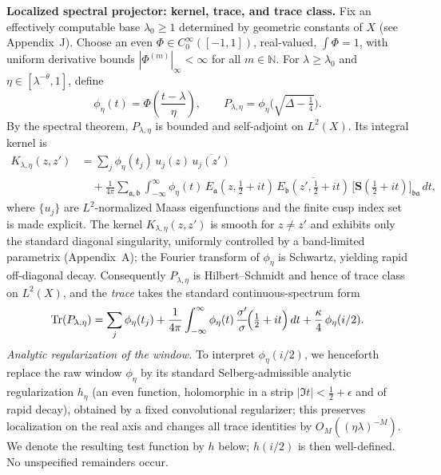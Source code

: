 \medskip
\noindent\textbf{Localized spectral projector: kernel, trace, and trace class.}
Fix an effectively computable base $\lambda_0\ge1$ determined by geometric constants of $X$ (see Appendix~J). Choose an even $\Phi\in C_0^\infty([-1,1])$, real-valued, $\int\Phi=1$, with uniform derivative bounds $|\Phi^{(m)}|_\infty<\infty$ for all $m\in\mathbb{N}$. For $\lambda\ge\lambda_0$ and $\eta\in[\lambda^{-\theta},1]$, define
\[
\phi_\eta(t)=\Phi\!\left(\frac{t-\lambda}{\eta}\right),\qquad 
P_{\lambda,\eta}=\phi_\eta\!\Big(\sqrt{\Delta-\tfrac14}\Big).
\]
By the spectral theorem, $P_{\lambda,\eta}$ is bounded and self-adjoint on $L^2(X)$. Its integral kernel is
\begin{equation}\label{eq:kernel}
\begin{aligned}
K_{\lambda,\eta}(z,z') &= 
\sum_j \phi_\eta(t_j)\,u_j(z)\,\overline{u_j(z')} \\
&\quad+ \frac{1}{4\pi}\sum_{\mathfrak{a},\mathfrak{b}}
\int_{-\infty}^{\infty} \phi_\eta(t)\,E_\mathfrak{a}(z,\tfrac12+it)\,
\overline{E_\mathfrak{b}(z',\tfrac12+it)}\,
\big[\mathbf{S}(\tfrac12+it)\big]_{\mathfrak{b}\mathfrak{a}}\,dt,
\end{aligned}
\end{equation}
where $\{u_j\}$ are $L^2$-normalized Maass eigenfunctions and the finite cusp index set is made explicit. The kernel $K_{\lambda,\eta}(z,z')$ is smooth for $z\neq z'$ and exhibits only the standard diagonal singularity, uniformly controlled by a band-limited parametrix (Appendix~A); the Fourier transform of $\phi_\eta$ is Schwartz, yielding rapid off-diagonal decay. Consequently $P_{\lambda,\eta}$ is Hilbert--Schmidt and hence of trace class on $L^2(X)$, and the \emph{trace} takes the standard continuous-spectrum form
\begin{equation}\label{eq:trace-decomp}
\operatorname{Tr}(P_{\lambda,\eta}) = 
\sum_j \phi_\eta(t_j) 
+ \frac{1}{4\pi}\int_{-\infty}^{\infty} 
\phi_\eta(t)\,\frac{\sigma'}{\sigma}\!\Big(\tfrac12+it\Big)\,dt
+ \frac{\kappa}{4}\,\phi_\eta(i/2).
\end{equation}
\emph{Analytic regularization of the window.} To interpret $\phi_\eta(i/2)$, we henceforth replace the raw window $\phi_\eta$ by its standard Selberg-admissible analytic regularization $h_\eta$ (an even function, holomorphic in a strip $|\Im t|<\tfrac12+\epsilon$ and of rapid decay), obtained by a fixed convolutional regularizer; this preserves localization on the real axis and changes all trace identities by $O_M((\eta\lambda)^{-M})$. We denote the resulting test function by $h$ below; $h(i/2)$ is then well-defined. No unspecified remainders occur.

